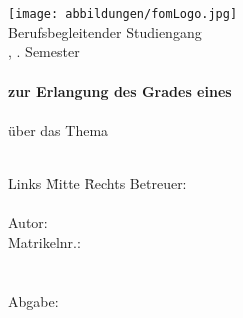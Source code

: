 \documentclass[12pt,oneside,titlepage,listof=totoc,bibliography=totoc]{scrartcl}
\begin{document}
\renewcommand{\refname}{Literaturverzeichnis}		%

\begin{titlepage}
	\begin{center}
		\textbf{\myHochschulName}\\
		\textbf{\myHochschulStandort}\\
		\vspace{1.5cm}
			\texttt{[image: abbildungen/fomLogo.jpg]} \\
		\vspace{1.5cm}
		Berufsbegleitender Studiengang\\
		\myStudiengang, \mySemesterZahl. Semester\\
		\vspace{2cm}
		\textbf{\myThesisArt}\\
		\textbf{zur Erlangung des Grades eines}\\
		\textbf{\myAkademischerGrad}\\
		\vspace{2cm}
		über das Thema\\
		\Huge{\myTitel}\\
		\vspace{0.2cm}
	\end{center}
	\normalsize
	\vfill
	\begin{tabbing}
		Links \= Mitte \= Rechts\kill
		Betreuer: \> \> \myBetreuer\\
		\> \> \\

		Autor: \> \> \myAutor\\
		\> \>  Matrikelnr.: \myMatrikelNr\\
		\> \> \myAdresse\\
		\> \> \\
		Abgabe: \> \> \myAbgabeDatum
	\end{tabbing}
\end{titlepage}

\end{document}
